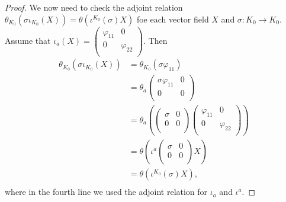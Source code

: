 \begin{proof}
We now need to check the adjoint relation $\theta_{K_0}\left( \sigma \iota_{K_0}(X)\right )=\theta \left (\iota^{K_0}(\sigma )X\right )$ foe each vector field $X$ and $\sigma :K_0\to K_0$. Assume that $\iota_a(X)=\left (\begin{smallmatrix} \varphi_{11} & 0 \\ 0 & \varphi_{22} \\ \end{smallmatrix} \right )$. Then
$$
\begin{aligned}
\theta_{K_0}\left( \sigma \iota_{K_0}(X)\right ) &= \theta_{K_0}(\sigma \varphi_{11}) \\
																								 &= \theta_a \left (\begin{smallmatrix} \sigma \varphi_{11} & 0 \\ 0 & 0 \\ \end{smallmatrix} \right ) \\
																								 &= \theta_a  \left ( \left (\begin{smallmatrix} \sigma & 0 \\ 0 & 0 \\ \end{smallmatrix} \right )\left (\begin{smallmatrix} \varphi_{11} & 0 \\ 0 & \varphi_{22} \\ \end{smallmatrix} \right ) \right )  \\
																								 &= \theta \left (\iota^a\left (\begin{smallmatrix} \sigma & 0 \\ 0 & 0 \\ \end{smallmatrix} \right )X\right ) \\
																								 &= \theta \left (\iota^{K_0}(\sigma )X\right ), \\
\end{aligned}
$$
where in the fourth line we used the adjoint relation for $\iota_a$ and $\iota^a$.


\end{proof}
